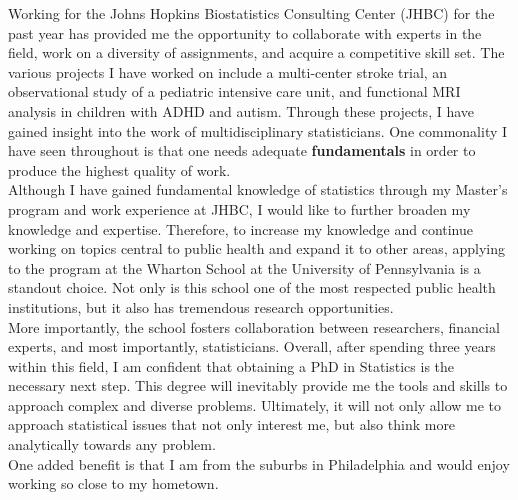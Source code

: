 \documentclass[12pt]{article}
\begin{document}
Working for the Johns Hopkins Biostatistics Consulting Center (JHBC) for the past year has provided me the opportunity to collaborate with experts in the field, work on a diversity of assignments, and acquire a competitive skill set. The various projects I have worked on include a multi-center stroke trial, an observational study of a pediatric intensive care unit, and functional MRI analysis in children with ADHD and autism. Through these projects, I have gained insight into the work of multidisciplinary statisticians. One commonality I have seen throughout is that one needs adequate \textbf{fundamentals} in order to produce the highest quality of work. \\

Although I have gained fundamental knowledge of statistics through my Master's program and work experience at JHBC, I would like to further broaden my knowledge and expertise. Therefore, to increase my knowledge and continue working on topics central to public health and expand it to other areas, applying to the program at the Wharton School at the University of Pennsylvania is a standout choice. Not only is this school one of the most respected public health institutions, but  it also has tremendous research opportunities.  \\

More importantly, the school fosters collaboration between researchers, financial experts, and most importantly, statisticians.  Overall, after spending three years within this field, I am confident that obtaining a PhD in Statistics is the necessary next step. This degree will inevitably provide me the tools and skills to approach complex and diverse problems. Ultimately, it will not only allow me to approach statistical issues that not only interest me, but also think more analytically towards any problem.\\

One added benefit is that I am from the suburbs in Philadelphia and would enjoy working so close to my hometown.
\end{document}
